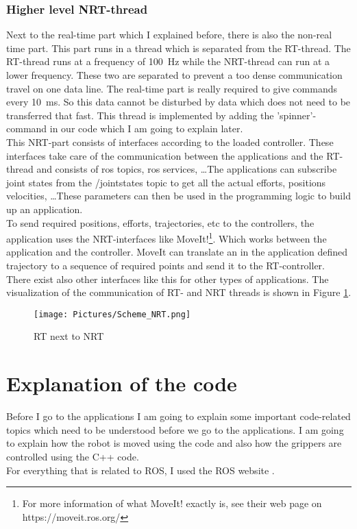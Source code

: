\documentclass[11pt,a4paper]{report}
\begin{document}
\subsection{Higher level NRT-thread}
Next to the real-time part which I explained before, there is also the non-real time part. This part runs in a thread which is separated from the RT-thread. The RT-thread runs at a frequency of 100~Hz while the NRT-thread can run at a lower frequency. These two are separated to prevent a too dense communication travel on one data line. The real-time part is really required to give commands every 10~ms. So this data cannot be disturbed by data which does not need to be transferred that fast. This thread is implemented by adding the 'spinner'-command in our code which I am going to explain later.\\
This NRT-part consists of interfaces according to the loaded controller. These interfaces take care of the communication between the applications and the RT-thread and consists of ros topics, ros services, \ldots The applications can subscribe joint states from the /joint\textunderscore states topic to get all the actual efforts, positions velocities, \ldots These parameters can then be used in the programming logic to build up an application.\\
To send required positions, efforts, trajectories, etc to the controllers, the application uses the NRT-interfaces like MoveIt!\footnote{For more information of what MoveIt! exactly is, see their web page on https://moveit.ros.org/}. Which works between the application and the controller. MoveIt can translate an in the application defined trajectory to a sequence of required points and send it to the RT-controller. There exist also other interfaces like this for other types of applications.
The visualization of the communication of RT- and NRT threads is shown in Figure \ref{fig:DataFlowROS}.
\begin{figure}[!ht]
	\centering
	\texttt{[image: Pictures/Scheme\_NRT.png]}
	\caption{RT next to NRT}
	\label{fig:DataFlowROS}
\end{figure}
\newpage

\chapter{Explanation of the code}
Before I go to the applications I am going to explain some important code-related topics which need to be understood before we go to the applications. I am going to explain how the robot is moved using the code and also how the grippers are controlled using the C++ code.\\
For everything that is related to ROS, I used the ROS website \cite{ROS}.
\end{document}
